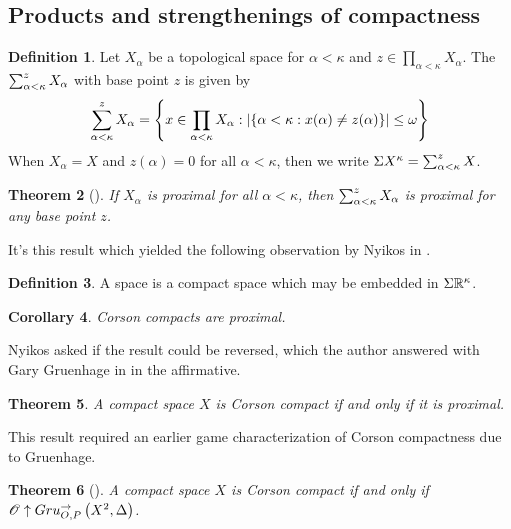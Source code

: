\documentclass{amsart}
\newtheorem{theorem}{Theorem}[section]
\newtheorem{corollary}[theorem]{Corollary}
\theoremstyle{definition}
\newtheorem{definition}[theorem]{Definition}
\begin{document}
\subsection{Products and strengthenings of compactness}

  \begin{definition}
    Let \(X_\alpha\) be a topological space for \(\alpha<\kappa\)
    and \(z\in\prod_{\alpha<\kappa}X_\alpha\).
    The  \(\sum_{\alpha<\kappa}^{z}X_\alpha\)
    with base point \(z\) is given by
    \[
      \sum_{\alpha<\kappa}^{z}X_\alpha
        =
      \left\{
        x\in \prod_{\alpha<\kappa}X_\alpha
      :
        |\{\alpha<\kappa:x(\alpha)\not=z(\alpha)\}|\leq\omega
      \right\}
    \]
    When \(X_\alpha=X\) and \(z(\alpha)=0\) for all \(\alpha<\kappa\),
    then we write \({\Sigma X^\kappa}=\sum_{\alpha<\kappa}^z X\).
  \end{definition}

  \begin{theorem}[\cite{MR3239205}]
    If \(X_\alpha\) is proximal for all \(\alpha<\kappa\),
    then \(\sum_{\alpha<\kappa}^{z}X_\alpha\) is proximal for any
    base point \(z\).
  \end{theorem}

  It's this result which yielded the following observation by Nyikos in
  \cite{MR3288115}.

  \begin{definition}
    A  space is a compact space which may be embedded in
    \(\Sigma\mathbb{R}^{\kappa}\).
  \end{definition}

  \begin{corollary}\label{nyikosObservation}
    Corson compacts are proximal.
  \end{corollary}

  Nyikos asked if the result could be reversed, which the author answered
  with Gary Gruenhage in \cite{MR3227201} in the affirmative.

  \begin{theorem}
    A compact space \(X\) is Corson compact if and only if it is
    proximal.
  \end{theorem}

  This result required an
  earlier game characterization of Corson compactness due to Gruenhage.

  \begin{theorem}[\cite{MR752278}]
    A compact space \(X\) is Corson compact if and only if
    \(\mathscr{O}\uparrow Gru_{O,P}^{\to}\left({X^2},{\Delta}\right)\).
  \end{theorem}
\end{document}

